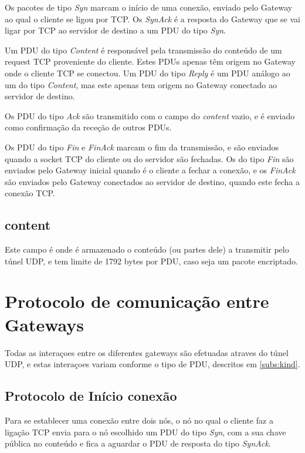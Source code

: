 \documentclass[a4paper]{report}
\begin{document}
Os pacotes de tipo \textit{Syn} marcam o início de uma conexão, enviado
pelo Gateway ao qual o cliente se ligou por TCP. Os \textit{SynAck}
é a resposta do Gateway que se vai ligar por TCP ao servidor de destino
a um PDU do tipo \textit{Syn}.

Um PDU do tipo \textit{Content} é responsável pela transmissão do conteúdo
de um request TCP proveniente do cliente. Estes PDUs apenas têm origem
no Gateway onde o cliente TCP se conectou. Um PDU do tipo \textit{Reply}
é um PDU análogo ao um do tipo \textit{Content}, mas este apenas tem origem
no Gateway conectado ao servidor de destino.

Os PDU do tipo \textit{Ack} são transmitido com o campo do \textit{content}
vazio, e é enviado como confirmação da receção de outros PDUs.

Os PDU do tipo \textit{Fin} e \textit{FinAck} marcam o fim da transmissão,
e são enviados quando a socket TCP do cliente ou do servidor são fechadas.
Os do tipo \textit{Fin} são enviados pelo Gateway inicial quando é o 
cliente a fechar a conexão, e os \textit{FinAck} são enviados pelo Gateway
conectados ao servidor de destino, quando este fecha a conexão TCP.

\subsection{content}

Este campo é onde é armazenado o conteúdo (ou partes dele) a transmitir pelo
túnel UDP, e tem limite de 1792 bytes por PDU, caso seja um pacote encriptado.

\section{Protocolo de comunicação entre Gateways}

Todas as interaçoes entre os diferentes gateways são efetuadas atraves do túnel
UDP, e estas interaçoes variam conforme o tipo de PDU, descritos em 
\ref{subs:kind}.

\subsection{Protocolo de Início conexão}

Para se establecer uma conexão entre dois nós, o nó no qual o cliente
faz a ligação TCP envia para o nó escolhido um PDU do tipo \textit{Syn},
com a sua chave pública no conteúdo e fica a aguardar o PDU de resposta 
do tipo \textit{SynAck}.
\end{document}
